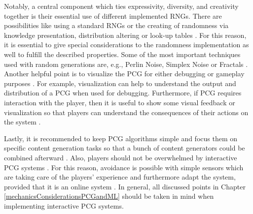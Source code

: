 \documentclass[MGS,Master,english]{twbook}%
\begin{document}
Notably, a central component which ties expressivity, diversity, and creativity together is their essential use of different implemented RNGs. There are possibilities like using a standard RNGs or the creating of randomness via knowledge presentation, distribution altering or look-up tables \cite{pcg::book}. For this reason, it is essential to give special considerations to the randomness implementation as well to fulfill the described properties. Some of the most important techniques used with random generations are, e.g., Perlin Noise, Simplex Noise or Fractals \cite{pcg::shortHistoryOfDynamicAndPCG}.\\
Another helpful point is to visualize the PCG for either debugging or gameplay purposes \cite{pcg::book}. For example, visualization can help to understand the output and distribution of a PCG when used for debugging. Furthermore, if PCG requires interaction with the player, then it is useful to show some visual feedback or visualization so that players can understand the consequences of their actions on the system \cite{pcg::endlessWeb}. 

Lastly, it is recommended to keep PCG algorithms simple and focus them on specific content generation tasks so that a bunch of content generators could be combined afterward \cite{pcg::book}.  Also, players should not be overwhelmed by interactive PCG systems \cite{pcg::shortHistoryOfDynamicAndPCG}. For this reason, avoidance is possible with simple sensors which are taking care of the players' experience and furthermore adapt the system, provided that it is an online system \cite{pcg::shortHistoryOfDynamicAndPCG}.  In general, all discussed points in Chapter \ref{mechanicsConsiderationsPCGandML} should be taken in mind when implementing interactive PCG systems.
\end{document}
